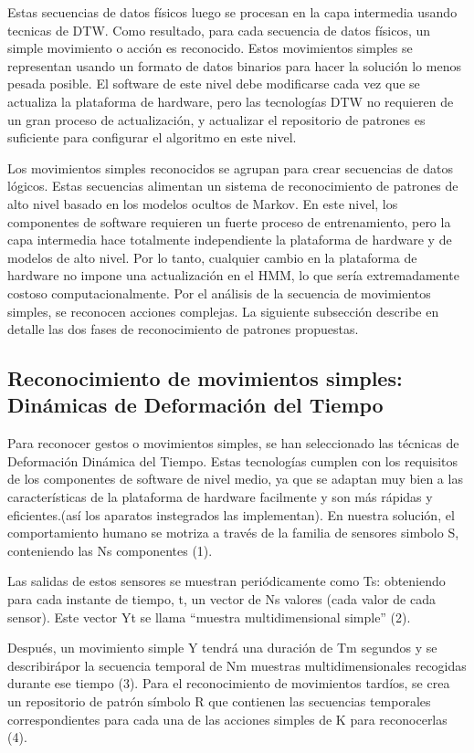 \documentclass{article}
\begin{document}
Estas secuencias de datos físicos luego se procesan en la capa intermedia usando tecnicas de DTW. Como resultado, para cada secuencia de datos físicos, un simple movimiento o acción es reconocido. Estos movimientos simples se representan usando un formato de datos binarios para hacer la solución lo menos pesada posible. El software de este nivel debe modificarse cada vez que se actualiza la plataforma de hardware, pero las tecnologías DTW no requieren de un gran proceso de actualización, y actualizar el repositorio de patrones es suficiente para configurar el
algoritmo en este nivel.

Los movimientos simples reconocidos se agrupan para crear secuencias de datos lógicos. Estas secuencias alimentan un sistema de reconocimiento de patrones de alto nivel basado en los modelos ocultos de Markov. En este nivel, los componentes de software requieren un fuerte proceso de entrenamiento, pero la capa intermedia hace totalmente independiente la plataforma de hardware y de modelos de alto nivel. Por lo tanto, cualquier cambio en la plataforma de hardware no impone una actualización en el HMM, lo que sería extremadamente costoso computacionalmente. Por el análisis de
la secuencia de movimientos simples, se reconocen acciones complejas.
La siguiente subsección describe en detalle las dos fases de reconocimiento de patrones propuestas.

\subsection{Reconocimiento de movimientos simples: Dinámicas de Deformación del Tiempo}
Para reconocer gestos o movimientos simples, se han seleccionado las técnicas de Deformación Dinámica del Tiempo. Estas tecnologías cumplen con los requisitos de los componentes de software de nivel medio, ya que se adaptan muy bien a las características de la plataforma de hardware facilmente y son más rápidas y eficientes.(así los aparatos instegrados las implementan).
En nuestra solución, el comportamiento humano se motriza a través de la familia de sensores simbolo S, conteniendo las Ns componentes (1).


Las salidas de estos sensores se muestran periódicamente como Ts: obteniendo para cada instante de tiempo, t, un vector de  Ns valores (cada valor de cada sensor). Este vector  Yt se llama “muestra multidimensional simple” (2).


Después, un movimiento simple Y tendrá una duración de  Tm  segundos y se describirápor la secuencia temporal de Nm muestras multidimensionales recogidas durante ese tiempo (3). Para el reconocimiento de movimientos tardíos, se crea un repositorio de patrón símbolo R que contienen las secuencias temporales correspondientes para cada una de las acciones simples de K para reconocerlas (4). 
\end{document}
